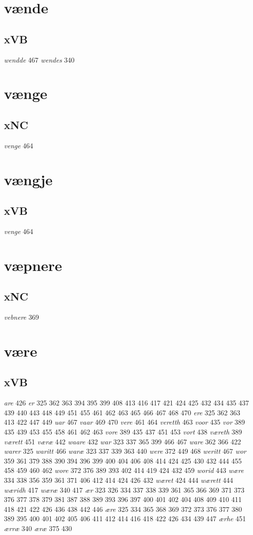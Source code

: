 \documentclass[a4paper,twocolumn]{article}
\begin{document}
\section{vænde}
\label{sec:org193e606}
\subsection{xVB}
\label{sec:orgf3cc80f}
\emph{wendde} 467 \emph{wendes} 340 
\section{vænge}
\label{sec:org002161b}
\subsection{xNC}
\label{sec:org27761a4}
\emph{venge} 464 
\section{vængje}
\label{sec:org2ceb0b2}
\subsection{xVB}
\label{sec:orga2f546f}
\emph{venge} 464 
\section{væpnere}
\label{sec:org09ef89d}
\subsection{xNC}
\label{sec:orgea15885}
\emph{vebnere} 369 
\section{være}
\label{sec:org0c6868e}
\subsection{xVB}
\label{sec:orgfca719d}
\emph{are} 426 \emph{er} 325 362 363 394 395 399 408 413 416 417 421 424 425 432 434 435 437 439 440 443 448 449 451 455 461 462 463 465 466 467 468 470 \emph{ere} 325 362 363 413 422 447 449 \emph{uar} 467 \emph{vaar} 469 470 \emph{vere} 461 464 \emph{veretth} 463 \emph{voor} 435 \emph{vor} 389 435 439 453 455 458 461 462 463 \emph{vore} 389 435 437 451 453 \emph{vort} 438 \emph{væreth} 389 \emph{værett} 451 \emph{væræ} 442 \emph{waare} 432 \emph{war} 323 337 365 399 466 467 \emph{ware} 362 366 422 \emph{warer} 325 \emph{waritt} 466 \emph{waræ} 323 337 339 363 440 \emph{were} 372 449 468 \emph{weritt} 467 \emph{wor} 359 361 379 388 390 394 396 399 400 404 406 408 414 424 425 430 432 444 455 458 459 460 462 \emph{wore} 372 376 389 393 402 414 419 424 432 459 \emph{worid} 443 \emph{wære} 334 338 356 359 361 371 406 412 414 424 426 432 \emph{wæret} 424 444 \emph{wærett} 444 \emph{wæridh} 417 \emph{wæræ} 340 417 \emph{ær} 323 326 334 337 338 339 361 365 366 369 371 373 376 377 378 379 381 387 388 389 393 396 397 400 401 402 404 408 409 410 411 418 421 422 426 436 438 442 446 \emph{ære} 325 334 365 368 369 372 373 376 377 380 389 395 400 401 402 405 406 411 412 414 416 418 422 426 434 439 447 \emph{ærhe} 451 \emph{ærræ} 340 \emph{æræ} 375 430 
\end{document}
